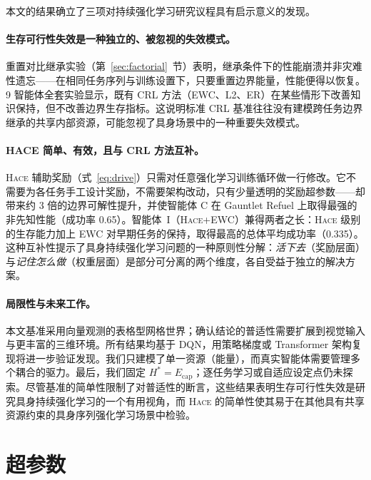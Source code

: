 \documentclass[zihao=5,a4paper,linespread=1.3,fontset=fandol]{ctexart}
\newcommand{\setpoint}{H^*}
\newcommand{\energy}{E}
\newcommand{\hace}{\textsc{Hace}}
\begin{document}
本文的结果确立了三项对持续强化学习研究议程具有启示意义的发现。

\paragraph{生存可行性失效是一种独立的、被忽视的失效模式。}
重置对比继承实验（第~\ref{sec:factorial}~节）表明，继承条件下的性能崩溃并非灾难性遗忘——在相同任务序列与训练设置下，只要重置边界能量，性能便得以恢复。9 智能体全套实验显示，既有 CRL 方法（EWC、L2、ER）在某些情形下改善知识保持，但不改善边界生存指标。这说明标准 CRL 基准往往没有建模跨任务边界继承的共享内部资源，可能忽视了具身场景中的一种重要失效模式。

\paragraph{HACE 简单、有效，且与 CRL 方法互补。}
\hace{} 辅助奖励（式~\ref{eq:drive}）只需对任意强化学习训练循环做一行修改。它不需要为各任务手工设计奖励，不需要架构改动，只有少量透明的奖励超参数——却带来约 3 倍的边界可解性提升，并使智能体 C 在 Gauntlet Refuel 上取得最强的非先知性能（成功率 0.65）。智能体~I（\hace{}+EWC）兼得两者之长：\hace{} 级别的生存能力加上 EWC 对早期任务的保持，取得最高的总体平均成功率（0.335）。这种互补性提示了具身持续强化学习问题的一种原则性分解：\emph{活下去}（奖励层面）与\emph{记住怎么做}（权重层面）是部分可分离的两个维度，各自受益于独立的解决方案。

\paragraph{局限性与未来工作。}
本文基准采用向量观测的表格型网格世界；确认结论的普适性需要扩展到视觉输入与更丰富的三维环境。所有结果均基于 DQN，用策略梯度或 Transformer 架构复现将进一步验证发现。我们只建模了单一资源（能量），而真实智能体需要管理多个耦合的驱力。最后，我们固定 $\setpoint = \energy_{\text{cap}}$；逐任务学习或自适应设定点仍未探索。尽管基准的简单性限制了对普适性的断言，这些结果表明生存可行性失效是研究具身持续强化学习的一个有用视角，而 \hace{} 的简单性使其易于在其他具有共享资源约束的具身序列强化学习场景中检验。



\clearpage
\appendix

\section{超参数}
\label{app:hyperparams}
\end{document}
